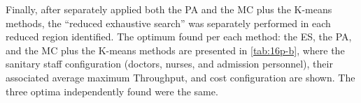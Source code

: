 \documentclass[11pt]{article} %
\begin{document}
Finally, after separately applied both the PA and the MC plus the
K-means methods, the \textquotedblleft{}reduced exhaustive search\textquotedblright{}
was separately performed in each reduced region identified. The optimum
found per each method: the ES, the PA, and the MC plus the K-means
methods are presented in \ref{tab:16p-b}, where the sanitary staff
configuration (doctors, nurses, and admission personnel), their associated
average maximum Throughput, and cost configuration are shown. The
three optima independently found were the same.

\end{document}
